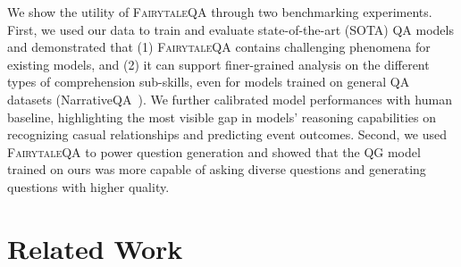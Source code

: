 \documentclass[11pt]{article}
\newcommand{\datasetname}{\textsc{FairytaleQA}\xspace}
\begin{document}
We show the utility of \datasetname through two benchmarking experiments.
First, we used our data to train and evaluate state-of-the-art (SOTA) QA models and demonstrated that (1) \datasetname contains challenging phenomena for existing models, and (2) it can support finer-grained analysis on the different types of comprehension sub-skills, even for models trained on general QA datasets (NarrativeQA~\cite{kovcisky2018narrativeqa}).
We further calibrated model performances with human baseline, highlighting the most visible gap in models' reasoning capabilities on recognizing casual relationships and predicting event outcomes.
Second, we used \datasetname to power question generation and showed that the QG model trained on ours was more capable of asking diverse questions and generating questions with higher quality.


\section{Related Work}
\end{document}
